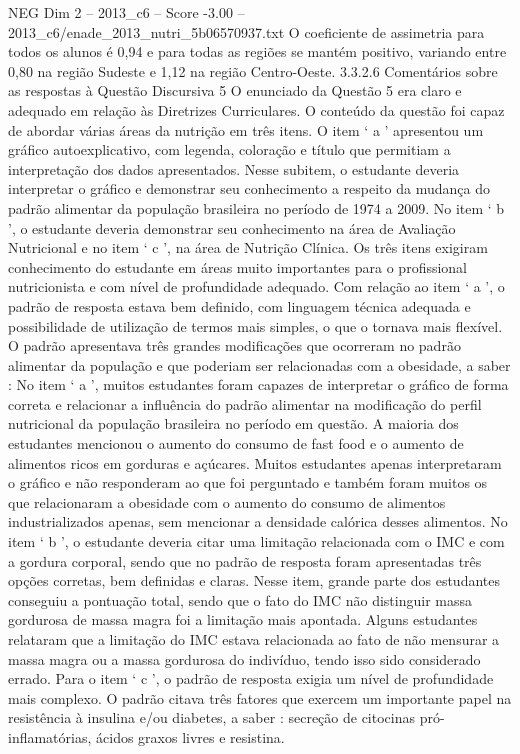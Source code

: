 \begin{textsample}{NEG Dim 2 – 2013\_c6 – Score -3.00 – 2013\_c6/enade\_2013\_nutri\_5b06570937.txt}
O coeficiente de assimetria para todos os alunos é 0,94 e para todas as regiões se mantém positivo, variando entre 0,80 na região Sudeste e 1,12 na região Centro-Oeste. 3.3.2.6 Comentários sobre as respostas à Questão Discursiva 5 O enunciado da Questão 5 era claro e adequado em relação às Diretrizes Curriculares.
O conteúdo da questão foi capaz de abordar várias áreas da nutrição em três itens.
O item ‘ a ’ apresentou um gráfico autoexplicativo, com legenda, coloração e título que permitiam a interpretação dos dados apresentados.
Nesse subitem, o estudante deveria interpretar o gráfico e demonstrar seu conhecimento a respeito da mudança do padrão alimentar da população brasileira no período de 1974 a 2009.
No item ‘ b ’, o estudante deveria demonstrar seu conhecimento na área de Avaliação Nutricional e no item ‘ c ’, na área de Nutrição Clínica.
Os três itens exigiram conhecimento do estudante em áreas muito importantes para o profissional nutricionista e com nível de profundidade adequado.
Com relação ao item ‘ a ’, o padrão de resposta estava bem definido, com linguagem técnica adequada e possibilidade de utilização de termos mais simples, o que o tornava mais flexível.
O padrão apresentava três grandes modificações que ocorreram no padrão alimentar da população e que poderiam ser relacionadas com a obesidade, a saber : No item ‘ a ’, muitos estudantes foram capazes de interpretar o gráfico de forma correta e relacionar a influência do padrão alimentar na modificação do perfil nutricional da população brasileira no período em questão.
A maioria dos estudantes mencionou o aumento do consumo de fast food e o aumento de alimentos ricos em gorduras e açúcares.
Muitos estudantes apenas interpretaram o gráfico e não responderam ao que foi perguntado e também foram muitos os que relacionaram a obesidade com o aumento do consumo de alimentos industrializados apenas, sem mencionar a densidade calórica desses alimentos.
No item ‘ b ’, o estudante deveria citar uma limitação relacionada com o IMC e com a gordura corporal, sendo que no padrão de resposta foram apresentadas três opções corretas, bem definidas e claras.
Nesse item, grande parte dos estudantes conseguiu a pontuação total, sendo que o fato do IMC não distinguir massa gordurosa de massa magra foi a limitação mais apontada.
Alguns estudantes relataram que a limitação do IMC estava relacionada ao fato de não mensurar a massa magra ou a massa gordurosa do indivíduo, tendo isso sido considerado errado.
Para o item ‘ c ’, o padrão de resposta exigia um nível de profundidade mais complexo.
O padrão citava três fatores que exercem um importante papel na resistência à insulina e/ou diabetes, a saber : secreção de citocinas pró-inflamatórias, ácidos graxos livres e resistina.

\end{textsample}
